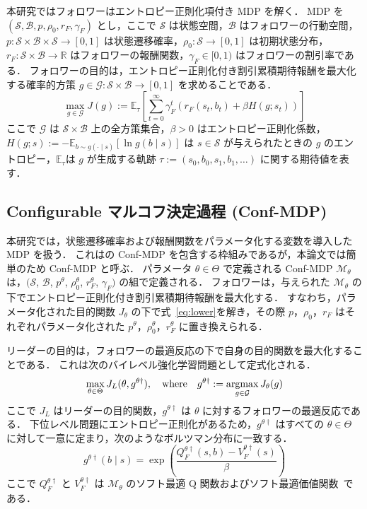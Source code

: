 \documentclass[originalpaper,fleqn]{jsaiart}     %
\providecommand{\argmax}{\operatornamewithlimits{argmax}} %
\providecommand{\E}{\mathbb{E}} %
\begin{document}
本研究ではフォロワーはエントロピー正則化項付き MDP を解く．
MDP を $(\mathcal{S}, \mathcal{B}, p, \rho_0, r_F, \gamma_F)$ とし，ここで $\mathcal{S}$ は状態空間，$\mathcal{B}$ はフォロワーの行動空間，$p: \mathcal{S}\times\mathcal{B}\times\mathcal{S}\to[0,1]$ は状態遷移確率，$\rho_0: \mathcal{S}\to[0,1]$ は初期状態分布，$r_F:\mathcal{S}\times\mathcal{B}\to\mathbb{R}$ はフォロワーの報酬関数，$\gamma_F\in[0,1)$ はフォロワーの割引率である．
フォロワーの目的は，エントロピー正則化付き割引累積期待報酬を最大化する確率的方策 $g\in\mathcal{G}: \mathcal{S} \times\mathcal{B}\to[0,1]$ を求めることである．
\begin{equation}
    \max_{g \in \mathcal{G}} J(g) := \E_{\tau}\left[ \sum_{t=0}^\infty \gamma_F^t \left(r_F(s_t, b_t) + \beta H(g;s_t)\right)\right]
    \label{eq:lower}
\end{equation}
ここで $\mathcal{G}$ は $\mathcal{S} \times \mathcal{B}$ 上の全方策集合，$\beta > 0$ はエントロピー正則化係数，$H(g; s) := -\E_{b \sim g(\cdot \mid s)}[\ln g(b \mid s)]$ は $s \in \mathcal{S}$ が与えられたときの $g$ のエントロピー，$\E_{\tau}$は $g$ が生成する軌跡 $\tau := (s_0, b_0, s_1, b_1, \dots)$ に関する期待値を表す．

\subsection{Configurable マルコフ決定過程 (Conf-MDP)}

本研究では，状態遷移確率および報酬関数をパラメータ化する変数を導入した MDP を扱う．
これは\cite{pmlr-v80-metelli18a}の Conf-MDP を包含する枠組みであるが，本論文では簡単のため Conf-MDP と呼ぶ．
パラメータ $\theta \in \Theta$ で定義される Conf-MDP $\mathcal{M}_{\theta}$ は，$(\mathcal{S}$, $\mathcal{B}$, $p^{\theta}$, $\rho_0^{\theta}$, $r_F^{\theta}$, $\gamma_F)$ の組で定義される．
フォロワーは，与えられた $\mathcal{M}_{\theta}$ の下でエントロピー正則化付き割引累積期待報酬を最大化する．
すなわち，パラメータ化された目的関数 $J_{\theta}$ の下で式~\eqref{eq:lower}を解き，その際 $p$，$\rho_0$，$r_F$ はそれぞれパラメータ化された $p^{\theta}$，$\rho_0^{\theta}$，$r_F^{\theta}$ に置き換えられる．

リーダーの目的は，フォロワーの最適反応の下で自身の目的関数を最大化することである．
これは次のバイレベル強化学習問題として定式化される．
\begin{equation}
    \max_{{\theta} \in \Theta} J_L({\theta},g^{\theta\dagger}), \quad \text{where} \quad g^{\theta\dagger} := \argmax_{g\in\mathcal{G}} J_{\theta}(g) \label{eq:upper}
\end{equation}
ここで $J_L$ はリーダーの目的関数，$g^{\theta\dagger}$ は $\theta$ に対するフォロワーの最適反応である．
下位レベル問題にエントロピー正則化があるため，$g^{\theta\dagger}$ はすべての $\theta\in\Theta$ に対して一意に定まり，次のようなボルツマン分布に一致する．
\begin{equation*}
    g^{\theta\dagger}(b\mid s)=\exp\left(\dfrac{Q_F^{\theta\dagger}(s,b)-V_F^{\theta\dagger}(s)}{\beta}\right)
\end{equation*}
ここで $Q_F^{\theta\dagger}$ と $V_F^{\theta\dagger}$ は $\mathcal{M}_{\theta}$ のソフト最適 Q 関数およびソフト最適価値関数~\cite{haarnoja2017reinforcement}である．
\end{document}

